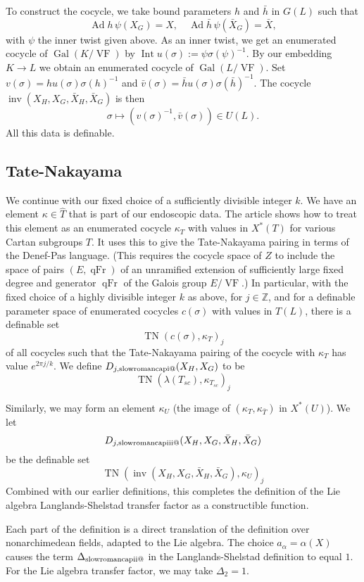 \documentclass[12pt]{amsart}
\makeatletter
\newcommand*{\rom}[1]{\text{\expandafter\@slowromancap\romannumeral #1@}}
\newcommand{\op}[1]{\operatorname{#1}}
\newcommand{\ring}[1]{{\mathbb #1}}
\def\VF{{\op{VF}}}
\theoremstyle{plain}
\theoremstyle{definition}
\makeatother
\begin{document}
To construct the cocycle, we take bound parameters $h$ and $\bar h$
 in $G(L)$ such that
\[
\op{Ad} h\,\psi(X_G)  = X,\quad \op{Ad} \bar h\, \psi(\bar X_G) = \bar X,
\]
with $\psi$ the inner twist given above.  As an inner twist, we get an
enumerated cocycle of $\op{Gal}(K/\VF)$ by $\op{Int} u(\sigma) := \psi
\sigma(\psi)^{-1}$.  By our embedding $K\to L$ we obtain an enumerated
cocycle of $\op{Gal}(L/\VF)$.  Set $v(\sigma) = h u(\sigma)
\sigma(h)^{-1}$ and $\bar v(\sigma) = \bar h u(\sigma) \sigma(\bar
h)^{-1}$. The cocycle $\op{inv}(X_H,X_G,\bar X_H,\bar X_G)$ is then
\[
\sigma \mapsto (v(\sigma)^{-1},\bar v(\sigma))\in U(L).
\]
All this data is definable.

\subsection{Tate-Nakayama}

We continue with our fixed choice of a sufficiently divisible integer
$k$.  We have an element $\kappa\in \hat T$ that is part of our
endoscopic data.  The article \cite{CHL} shows how to treat this
element as an enumerated cocycle $\kappa_T$ with values in $X^*(T)$
for various Cartan subgroups $T$.  It uses this to give the
Tate-Nakayama pairing in terms of the Denef-Pas language.  (This
requires the cocycle space of $Z$ to include the space of pairs
$(E,\op{qFr})$ of an unramified extension of sufficiently large fixed
degree and generator $\op{qFr}$ of the Galois group $E/\VF$.)  In
particular, with the fixed choice of a highly divisible integer $k$ as
above, for $j\in \ring{Z}$, and for a definable parameter space of
enumerated cocycles $c(\sigma)$ with values in $T(L)$, there is a
definable set
\[
\op{TN}( c(\sigma),\kappa_T)_j
\]
of all cocycles such that the Tate-Nakayama pairing of the cocycle with
$\kappa_T$ has value $e^{2\pi j/k}$.  We define $D_{j,\rom1}(X_H,X_G)$ to
be
\[
\op{TN}( \lambda(T_{sc}),\kappa_{T_{sc}})_j
\]

Similarly, we may form an element $\kappa_U$ (the image of
$(\kappa_T,\kappa_{\bar T})$ in $X^*(U)$).  We let
\[
D_{j,\rom{3}}(X_H,X_G,\bar X_H,\bar X_G)
\]
 be the definable set
\[
\op{TN}( \op{inv}(X_H,X_G,\bar
X_H,\bar X_G),\kappa_{U})_j
\]
Combined with our earlier definitions, this completes the definition
of the Lie algebra Langlands-Shelstad transfer factor as a
constructible function.


Each part of the definition is a direct translation of the definition
over nonarchimedean fields, adapted to the Lie algebra.  The choice
$a_\alpha = \alpha(X)$ causes the term $\Delta_{\rom2}$ in the
Langlands-Shelstad definition to equal $1$.  For the Lie algebra
transfer factor, we may take $\Delta_{2}=1$.
\end{document}
